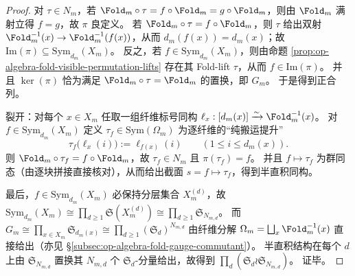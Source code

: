 \begin{proof}
对 \(\tau\in N_m\)，若 \(\Fold_m\circ\tau=f\circ\Fold_m=g\circ\Fold_m\)，则由 \(\Fold_m\) 满射立得 \(f=g\)，故 \(\pi\) 良定义。
若 \(\Fold_m\circ\tau=f\circ\Fold_m\)，则 \(\tau\) 给出双射 \(\Fold_m^{-1}(x)\to\Fold_m^{-1}(f(x))\)，从而 \(d_m(f(x))=d_m(x)\)；故 \(\mathrm{Im}(\pi)\subseteq \mathrm{Sym}_{d_m}(X_m)\)。
反之，若 \(f\in \mathrm{Sym}_{d_m}(X_m)\)，则由命题 \ref{prop:op-algebra-fold-visible-permutation-lifts} 存在其 Fold-lift \(\tau\)，从而 \(f\in\mathrm{Im}(\pi)\)。
并且 \(\ker(\pi)\) 恰为满足 \(\Fold_m\circ\tau=\Fold_m\) 的置换，即 \(G_m\)。
于是得到正合列。
\par
裂开：对每个 \(x\in X_m\) 任取一组纤维标号同构
\(
\ell_x:[d_m(x)]\xrightarrow{\sim}\Fold_m^{-1}(x)
\)。
对 \(f\in\mathrm{Sym}_{d_m}(X_m)\) 定义 \(\tau_f\in \mathrm{Sym}(\Omega_m)\) 为逐纤维的“纯搬运提升”
\[
\tau_f\bigl(\ell_x(i)\bigr):=\ell_{f(x)}(i)\qquad(1\le i\le d_m(x)).
\]
则 \(\Fold_m\circ\tau_f=f\circ\Fold_m\)，故 \(\tau_f\in N_m\) 且 \(\pi(\tau_f)=f\)。
并且 \(f\mapsto \tau_f\) 为群同态（由逐块拼接直接核对），从而给出截面 \(s=f\mapsto \tau_f\)，得到半直积同构。
\par
最后，\(f\in \mathrm{Sym}_{d_m}(X_m)\) 必保持分层集合 \(X_m^{(d)}\)，故
\(
\mathrm{Sym}_{d_m}(X_m)\cong\prod_{d\ge 1}\mathfrak S(X_m^{(d)})\cong\prod_{d\ge 1}\mathfrak S_{N_{m,d}}
\)。
而 \(G_m\cong\prod_{x\in X_m}\mathfrak S_{d_m(x)}\cong\prod_{d\ge 1}(\mathfrak S_d)^{N_{m,d}}\) 由纤维分解 \(\Omega_m=\bigsqcup_x\Fold_m^{-1}(x)\) 直接给出（亦见 \S\ref{subsec:op-algebra-fold-gauge-commutant}）。
半直积结构在每个 \(d\) 上由 \(\mathfrak S_{N_{m,d}}\) 置换其 \(N_{m,d}\) 个 \(\mathfrak S_d\)-分量给出，故得到 \(\prod_d(\mathfrak S_d\wr \mathfrak S_{N_{m,d}})\)。
证毕。
\end{proof}

